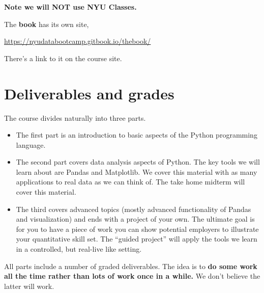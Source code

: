 \textbf{Note we will NOT use NYU Classes.}

The {\bf book\/} has its own site,
\vspace{-0.15in}
\begin{center}
\url{https://nyudatabootcamp.gitbook.io/thebook/}
\end{center}
\vspace{-0.15in}
%
There's a link to it on the course site.

\section*{Deliverables and grades}

The course divides naturally into three parts.
\begin{itemize}
\item The first part is an introduction to basic aspects of the Python programming language. 
\item The second part covers data analysis aspects of Python. The key tools we will learn about are Pandas and Matplotlib. We cover this material with as many applications to real data as we can think of.  The take home midterm will cover this material.
\item The third covers advanced topics (mostly advanced functionality of Pandas and visualization) and ends with a project of your own. The ultimate goal is for you to have a piece of work you can show potential employers to illustrate your quantitative skill set. The ``guided project'' will apply the tools we learn in a controlled, but real-live like setting.
\end{itemize}
All parts include a number of graded deliverables. The idea is to {\bf do some work all the time rather than lots of work once in a while.} We don't believe the latter will work.

